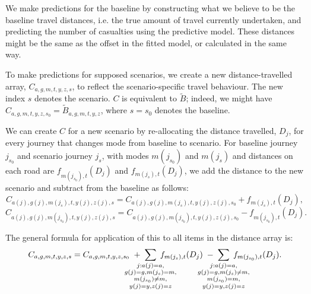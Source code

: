 \documentclass{article}
\begin{document}
We make predictions for the baseline by constructing what we believe to be the baseline travel distances, i.e. the true amount of travel currently undertaken, and predicting the number of casualties using the predictive model. These distances might be the same as the offset in the fitted model, or calculated in the same way. %

To make predictions for supposed scenarios, we create a new distance-travelled array, ${C}_{a,g,m,t,y,z,s}$, to reflect the scenario-specific travel behaviour. The new index $s$ denotes the scenario. $C$ is equivalent to $\tilde{B}$; indeed, we might have ${C}_{a,g,m,t,y,z,s_0}=\tilde{B}_{a,g,m,t,y,z}$, where $s=s_0$ denotes the baseline.

We can create $C$ for a new scenario by re-allocating the distance travelled, $D_j$, for every journey that changes mode from baseline to scenario. For baseline journey  $j_{s_0}$  and scenario journey $j_s$, with modes $m(j_{s_0})$ and $m(j_s)$ and distances on each road are $f_{m(j_{s_0}),t}(D_{j})$ and $f_{m(j_s),t}(D_{j})$, we add the distance to the new scenario and subtract from the baseline as follows:
$${C}_{a(j),g(j),m(j_s),t,y(j),z(j),s} = {C}_{a(j),g(j),m(j_s),t,y(j),z(j),s_0}+f_{m(j_s),t}(D_{j}),$$
$$C_{a(j),g(j),m(j_{s_0}),t,y(j),z(j),s} = C_{a(j),g(j),m(j_{s_0}),t,y(j),z(j),s_0}-f_{m(j_{s_0}),t}(D_{j}).$$

The general formula for application of this to all items in the distance array is:
$${C}_{a,g,m,t,y,z,s} = {C}_{a,g,m,t,y,z,s_0}\;+\;\smashoperator{\sum_{\substack{j:a(j)=a,\\g(j)=g,m(j_s)=m,\\m(j_{s_0})\neq m,\\y(j)=y,z(j)=z}}}\;f_{m(j_s),t}(D_{j})\;-\;\smashoperator{\sum_{\substack{j:a(j)=a,\\g(j)=g,m(j_s)\neq m,\\m(j_{s_0})= m,\\y(j)=y,z(j)=z}}}\;f_{m(j_{s_0}),t}(D_{j}).$$
\end{document}
